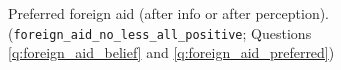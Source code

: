 
\begin{figure} 
    \cprotect\caption[Preferred foreign aid (summary)]{Preferred foreign aid (after info or after perception). (\verb|foreign_aid_no_less_all_positive|; Questions \ref{q:foreign_aid_belief} and \ref{q:foreign_aid_preferred})}\label{fig:foreign_aid_no_less_all}
\end{figure} 

